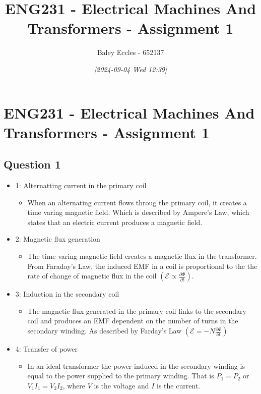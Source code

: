 \documentclass[11pt]{article}
\author{Baley Eccles - 652137}
\date{\textit{{[}2024-09-04 Wed 12:39]}}
\title{ENG231 - Electrical Machines And Transformers - Assignment 1}
\begin{document}
\maketitle
\tableofcontents

\section{ENG231 - Electrical Machines And Transformers - Assignment 1}
\label{sec:orgee24842}
\subsection{Question 1}
\label{sec:orgeed3db3}
\begin{itemize}
\item 1: Alternatting current in the primary coil
\begin{itemize}
\item When an alternating current flows throug the primary coil, it creates a time varing magnetic field. Which is described by Ampere's Law, which states that an electric current produces a magnetic field.
\end{itemize}
\item 2: Magnetic flux generation
\begin{itemize}
\item The time varing magnetic field creates a magnetic flux in the transformer. From Faraday's Law, the induced EMF in a coil is proportional to the the rate of change of magnetic flux in the coil \(\left( \mathcal{E}\propto \frac{\partial \Phi}{\partial t}\right)\).
\end{itemize}
\item 3: Induction in the secondary coil
\begin{itemize}
\item The magnetic flux generated in the primary coil links to the secondary coil and produces an EMF dependent on the number of turns in the secondary winding. As described by Farday's Law \(\left( \mathcal{E}=-N\frac{\partial \Phi}{\partial t}  \right)\)
\end{itemize}
\item 4: Transfer of power
\begin{itemize}
\item In an ideal transformer the power induced in the secondary winding is equal to the power supplied to the primary winding. That is \(P_1=P_2\) or \(V_1I_1=V_2I_2\), where \(V\) is the voltage and \(I\) is the current.
\end{itemize}
\end{itemize}
\end{document}
